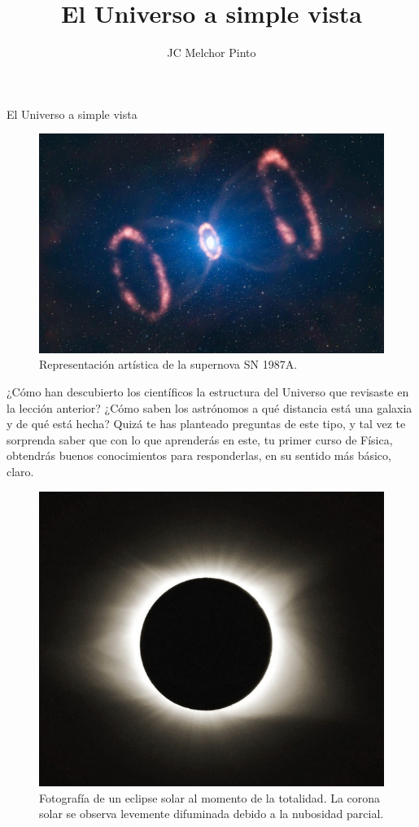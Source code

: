 \documentclass[12pt,addpoints,answers]{guia}
\title{El Universo a simple vista}
\author{JC Melchor Pinto}
\begin{document}
\INFO%
\begin{sectionbox}{El Universo a simple vista}
    \begin{figure}
        \centering
        \includegraphics[width=\linewidth]{../images/supernova-default.jpg}
        \caption{Representación artística de la supernova SN 1987A.}
        \label{fig:supernova-default}
    \end{figure}

    ¿Cómo han descubierto los científicos la estructura del Universo que revisaste en la lección anterior? ¿Cómo saben
    los astrónomos a qué distancia está una galaxia y de qué está
    hecha? Quizá te has planteado preguntas de este tipo, y tal
    vez te sorprenda saber que con lo que aprenderás en este, tu
    primer curso de Física, obtendrás buenos conocimientos para
    responderlas, en su sentido más básico, claro.

    \begin{figure}
        \centering
        \includegraphics[width=\linewidth]{../images/eclipse-solar-total-mexico-2024.jpg}
        \caption{Fotografía de un eclipse solar al momento de la totalidad. La corona solar se observa levemente difuminada debido a la nubosidad parcial.}
        \label{fig:eclipse-solar-total-mexico-2024}
    \end{figure}


\end{sectionbox}
\end{document}
